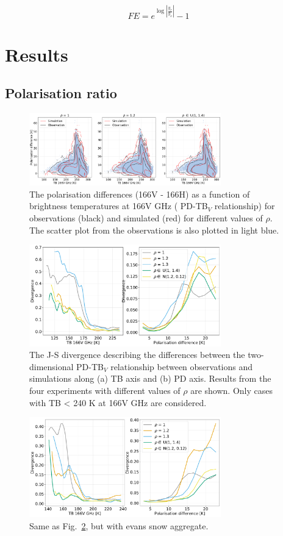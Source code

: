 \documentclass[amt, manuscript]{copernicus}
\begin{document}
\begin{equation}
FE = e^{\log\left|\frac{y_r}{y_o}\right|} - 1
\end{equation}




\section{Results}

\subsection{Polarisation ratio}
\label{sec:polratio}
\begin{figure}[t]
	\includegraphics[width=8.3cm]{Figures/PD_166.png}
	\caption{The polarisation differences (166V - 166H) as a function of brightness temperatures at 166V GHz ( PD-TB$_V$ relationship) for observations (black) and simulated (red) for different values of $\rho$. The scatter plot from the observations is also plotted in light blue. }
	\label{fig:PD_166}
\end{figure}
\begin{figure}[t]
	\includegraphics[width=8.3cm]{Figures/divergence.pdf}
	\caption{The J-S divergence describing the differences between the two-dimensional PD-TB$_V$ relationship between observations and simulations along (a) TB axis and (b) PD axis. Results from the four experiments with different values of $\rho$ are shown. Only cases with TB < 240\,\,K at 166V\,\,GHz are considered.}
	\label{fig:divergence_PD}
\end{figure}

\begin{figure}[t]
	\includegraphics[width=8.3cm]{Figures/divergence_esa.pdf}
	\caption{ Same as Fig.~\ref{fig:divergence_PD}, but with evans snow aggregate.}
	\label{fig:divergence_esa}
\end{figure}
\end{document}
